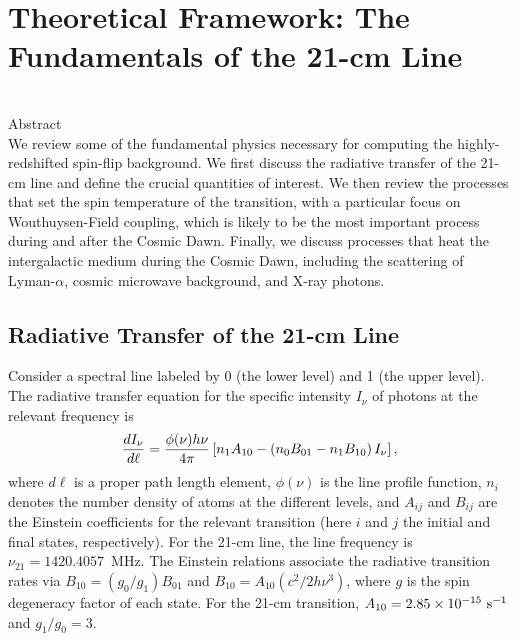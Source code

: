 \chapter{Theoretical Framework: The Fundamentals of the 21-cm Line}

\begin{bf}
  \author{Steven R. Furlanetto}\\

  Abstract\\

We review some of the fundamental physics necessary for computing the highly-redshifted spin-flip background. We first discuss the radiative transfer of the 21-cm line and define the crucial quantities of interest. We then review the processes that set the spin temperature of the transition, with a particular focus on Wouthuysen-Field coupling, which is likely to be the most important process during and after the Cosmic Dawn. Finally, we discuss processes that heat the intergalactic medium during the Cosmic Dawn, including the scattering of Lyman-$\alpha$, cosmic microwave background, and X-ray photons.
\end{bf}

\section{Radiative Transfer of the 21-cm Line} \label{rt-21cm}

Consider a spectral line labeled by 0 (the lower level) and 1 (the upper level). The radiative transfer equation for the specific intensity $I_\nu$ of photons at the relevant frequency is
\begin{equation}
{dI_\nu\over d\ell}={\phi(\nu) h\nu\over 4\pi}\left[n_1 A_{10} -
\left(n_0 B_{01} -n_1 B_{10}\right)I_\nu\right],
\label{rad}
\end{equation}
where $d\ell$ is a proper path length element, $\phi(\nu)$ is the line profile function, $n_i$
denotes the number density of atoms at the different levels, and $A_{ij}$ and $B_{ij}$ are the Einstein coefficients for the relevant transition (here $i$ and $j$ the initial and final states, respectively). For the 21-cm line, the line frequency is $\nu_{21} = 1420.4057$~MHz. The Einstein relations associate the radiative transition rates via $B_{10}=(g_0/g_1)B_{01}$ and $B_{10}=A_{10}(c^2/2 h\nu^3)$, where $g$ is the spin degeneracy factor of each state. For the 21-cm transition, $A_{10}=2.85\times 10^{-15} \ {\rm s^{-1}}$ and $g_1/g_0=3$.

